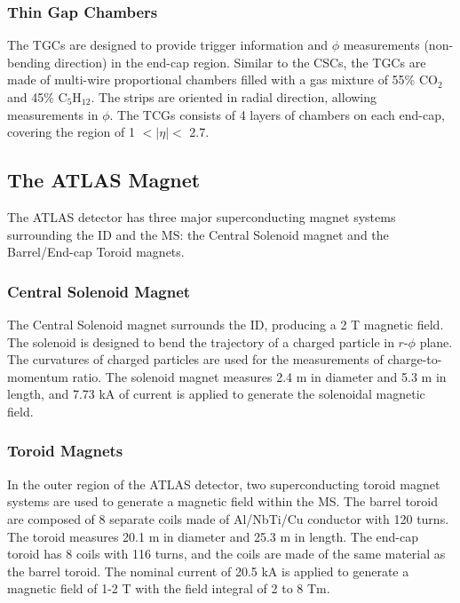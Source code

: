 \subsubsection{Thin Gap Chambers}
\label{sec:atlas:tgc}

The TGCs are designed to provide trigger information and $\phi$ measurements (non-bending direction) in the end-cap region. Similar to the CSCs, the TGCs are made of multi-wire proportional chambers filled with a gas mixture of 55\% $\mathrm{CO}_{2}$ and 45\% $\mathrm{C}_{5}\mathrm{H}_{12}$. The strips are oriented in radial direction, allowing measurements in $\phi$. The TCGs consists of 4 layers of chambers on each end-cap, covering the region of 1 $<|\eta|<$ 2.7.


\subsection{The ATLAS Magnet}
\label{sec:atlas:magnet}

The ATLAS detector has three major superconducting magnet systems surrounding the ID and the MS: the Central Solenoid magnet and the Barrel/End-cap Toroid magnets.

\subsubsection{Central Solenoid Magnet}
\label{sec:atlas:solenoid}
The Central Solenoid magnet surrounds the ID, producing a 2 T magnetic field. The solenoid is designed to bend the trajectory of a charged particle in $r$-$\phi$ plane. The curvatures of charged particles are used for the measurements of charge-to-momentum ratio. The solenoid magnet measures 2.4 \si{\meter} in diameter and 5.3 \si{\meter} in length, and 7.73 \si{\kilo\ampere} of current is applied to generate the solenoidal magnetic field.


\subsubsection{Toroid Magnets}
\label{sec:atlas:toroid}

In the outer region of the ATLAS detector, two superconducting toroid magnet systems are used to generate a magnetic field within the MS. The barrel toroid are composed of 8 separate coils made of Al/NbTi/Cu conductor with 120 turns. The toroid measures 20.1 \si{\meter} in diameter and 25.3 \si{\meter} in length. The end-cap toroid has 8 coils with 116 turns, and the coils are made of the same material as the barrel toroid. The nominal current of 20.5 \si{\kilo\ampere} is applied to generate a magnetic field of 1-2 T with the field integral of 2 to 8 Tm.

